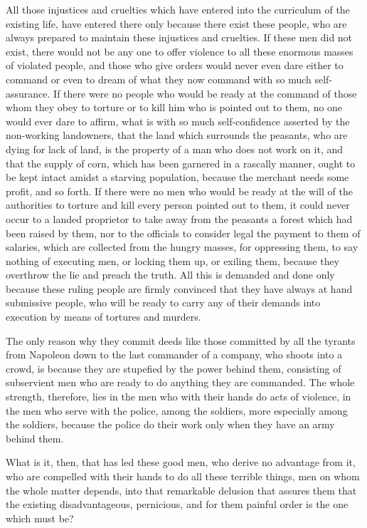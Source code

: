 \documentclass{book}
\begin{document}
All those injustices and cruelties which have entered into the curriculum of the existing life, have entered there only because there exist these people, who are always prepared to maintain these injustices and cruelties. If these men did not exist, there would not be any one to offer violence to all these enormous masses of violated people, and those who give orders would never even dare either to command or even to dream of what they now command with so much self-assurance. If there were no people who would be ready at the command of those whom they obey to torture or to kill him who is pointed out to them, no one would ever dare to affirm, what is with so much self-confidence asserted by the non-working landowners, that the land which surrounds the peasants, who are dying for lack of land, is the property of a man who does not work on it, and that the supply of corn, which has been garnered in a rascally manner, ought to be kept intact amidst a starving population, because the merchant needs some profit, and so forth. If there were no men who would be ready at the will of the authorities to torture and kill every person pointed out to them, it could never occur to a landed proprietor to take away from the peasants a forest which had been raised by them, nor to the officials to consider legal the payment to them of salaries, which are collected from the hungry masses, for oppressing them, to say nothing of executing men, or locking them up, or exiling them, because they overthrow the lie and preach the truth. All this is demanded and done only because these ruling people are firmly convinced that they have always at hand submissive people, who will be ready to carry any of their demands into execution by means of tortures and murders.

The only reason why they commit deeds like those committed by all the tyrants from Napoleon down to the last commander of a company, who shoots into a crowd, is because they are stupefied by the power behind them, consisting of subservient men who are ready to do anything they are commanded. The whole strength, therefore, lies in the men who with their hands do acts of violence, in the men who serve with the police, among the soldiers, more especially among the soldiers, because the police do their work only when they have an army behind them.

What is it, then, that has led these good men, who derive no advantage from it, who are compelled with their hands to do all these terrible things, men on whom the whole matter depends, into that remarkable delusion that assures them that the existing disadvantageous, pernicious, and for them painful order is the one which must be?
\end{document}
